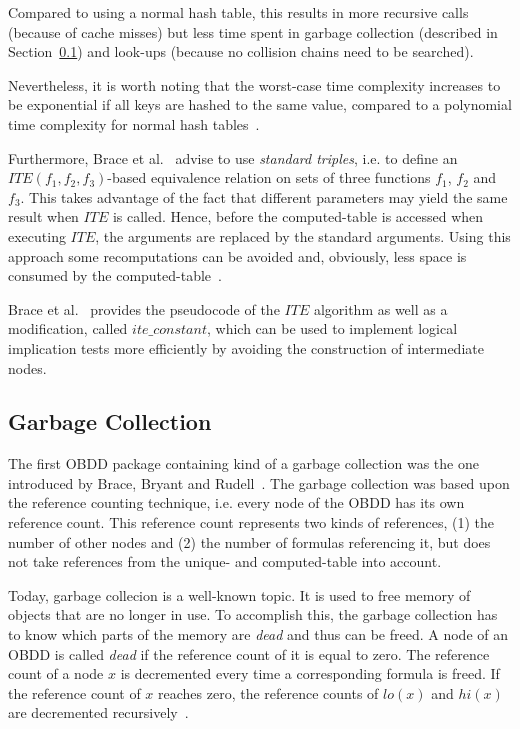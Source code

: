 \documentclass{vldb}
\begin{document}
Compared to using a normal hash table, this results in more recursive calls 
(because of cache misses) but less time spent in garbage collection (described
in Section~\ref{subsec:garbage-collection}) and look-ups (because no collision
chains need to be searched).

Nevertheless, it is worth noting that the worst-case time complexity increases
to be exponential if all keys are hashed to the same value, compared to a
polynomial time complexity for normal hash tables~\cite{BRACE90}. 

Furthermore, Brace et al.~\cite{BRACE90} advise to use \textit{standard triples},
i.e. to define an $ITE(f_1, f_2, f_3)$-based equivalence relation on sets of
three functions $f_1$, $f_2$ and $f_3$. This takes advantage of the fact that
different parameters may yield the same result when $ITE$ is called. Hence, before
the computed-table is accessed when executing $ITE$, the arguments are replaced
by the standard arguments. Using this approach some recomputations can be avoided
and, obviously, less space is consumed by the computed-table~\cite{BRACE90}.

Brace et al.~\cite[p. 42]{BRACE90} provides the pseudocode of the $ITE$ algorithm
as well as a modification, called $ite\_constant$, which can be used to implement
logical implication tests more efficiently by avoiding the construction of
intermediate nodes.

\subsection{Garbage Collection}
\label{subsec:garbage-collection}

The first OBDD package containing kind of a garbage collection was the one
introduced by Brace, Bryant and Rudell~\cite{BRACE90}. The garbage collection was
based upon the reference counting technique, i.e. every node of the OBDD has its own
reference count. This reference count represents two kinds of references, (1)
the number of other nodes and (2) the number of formulas referencing it, but does
not take references from the unique- and computed-table into account.

Today, garbage collecion is a well-known topic. It is used to free memory of
objects that are no longer in use. To accomplish this, the garbage collection has
to know which parts of the memory are \textit{dead} and thus can be freed. A node
of an OBDD is called \textit{dead} if the reference count of it is equal to zero.
The reference count of a node $x$ is decremented every time a corresponding
formula is freed. If the reference count of $x$ reaches zero, the reference counts
of $lo(x)$ and $hi(x)$ are decremented recursively~\cite{BRACE90}.
\end{document}
